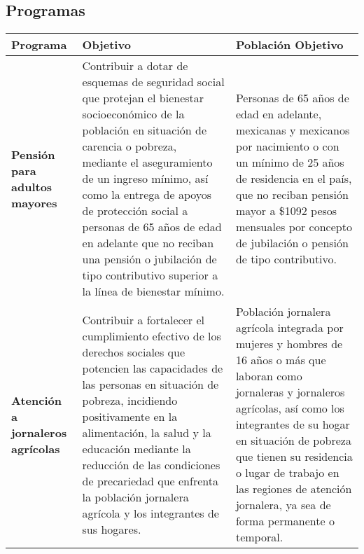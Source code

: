 \subsection{Programas}
\begin{longtable}{|p{4cm}|p{6cm}|p{6cm}|}
    \hline
    \textbf{Programa} & \textbf{Objetivo} & \textbf{Población Objetivo}\\
    \hline
    \hline
    \textbf{Pensión para adultos mayores} & Contribuir   a   dotar   de   esquemas   de seguridad     social     que     protejan el bienestar socioeconómico de la población   en situación  de   carencia   o pobreza,  mediante  el  aseguramiento  de un ingreso mínimo, así como la entrega de    apoyos    de    protección    social    a personas de 65 años de edad en adelante que no reciban una pensión o jubilación de  tipo  contributivo  superior  a  la  línea de bienestar mínimo. & Personas   de   65   años   de   edad   en adelante,  mexicanas  y  mexicanos  por nacimiento  o  con  un  mínimo  de  25 años  de  residencia  en  el  país,  que  no reciban pensión mayor a \$1092 pesos mensuales por concepto de jubilación o pensión de tipo contributivo. \\
    \hline
    \textbf{Atención a jornaleros agrícolas} & Contribuir  a fortalecer  el  cumplimiento efectivo  de  los  derechos  sociales  que potencien     las     capacidades     de     las personas    en    situación    de    pobreza, incidiendo positivamente en la alimentación,  la  salud  y  la  educación mediante la reducción de las condiciones de precariedad que enfrenta  la población  jornalera  agrícola y los integrantes de sus hogares. & Población jornalera agrícola integrada por  mujeres  y  hombres  de  16  años  o más  que  laboran  como  jornaleras  y jornaleros   agrícolas,   así   como   los integrantes  de  su  hogar  en  situación de pobreza que tienen su residencia o lugar  de  trabajo  en  las  regiones  de atención  jornalera,  ya  sea  de  forma permanente o temporal. \\
    \hline

\end{longtable}
